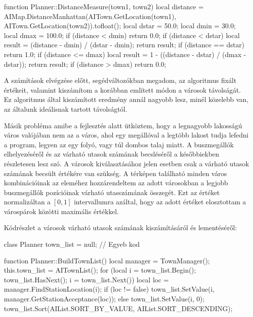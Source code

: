 \begin{cpp}
function Planner::DistanceMeasure(town1, town2)
{
  local distance = AIMap.DistanceManhattan(AITown.GetLocation(town1),
    AITown.GetLocation(town2)).tofloat();
  local dstar = 50.0;
  local dmin = 30.0;
  local dmax = 100.0;
  if (distance < dmin) {
    return 0.0;
  }
  if (distance < dstar) {
    local result = (distance - dmin) / (dstar - dmin);
    return result;
  }
  if (distance == dstar) {
    return 1.0;
  }
  if (distance <= dmax) {
    local result = 1 - ((distance - dstar) / (dmax - dstar));
    return result;
  }
  if (distance > dmax) {
    return 0.0;
  }
}
\end{cpp}

A számítások elvégzése előtt, segédváltozókban megadom, az algoritmus fixált értékeit, valamint kiszámítom a korábban említett módon a városok távolságát. Ez algoritmus által kiszámított eredmény annál nagyobb lesz, minél közelebb van, az általunk ideálisnak tartott távolságtól.

Másik probléma amibe a fejlesztés alatt ütköztem, hogy a legnagyobb lakosságú város valójában nem az a város, ahol egy megállóval a legtöbb lakost tudja lefedni a program, legyen az egy folyó, vagy túl dombos talaj miatt. A buszmegállók elhelyezéséről és az várható utasok számának becsléséről a későbbiekben részletesen lesz szó. A városok kiválasztásához jelen esetben csak a várható utasok számának becsült értékére van szükség. A térképen található minden város kombinációinak az eleméhez hozzárendeltem az adott városokban a legjobb buszmegállók pozícióinak várható utasszámának összegét. Ezt az értéket normalizáltan a $[0, 1]$ intervallumra azáltal, hogy az adott értéket elosztottam a várospárok közötti maximális értékkel.

Kódrészlet a városok várható utasok számának kiszámításáról és lementéséről:
\begin{cpp}

class Planner {
  town_list = null;
  // Egyeb kod
}

function Planner::BuildTownList()
{
  local manager = TownManager();
  this.town_list = AITownList();
  for (local i = town_list.Begin(); 
   town_list.HasNext(); i = town_list.Next()) {
    local loc = manager.FindStationLocation(i);
    if (loc != false) {
      town_list.SetValue(i, manager.GetStationAcceptance(loc));
    } else {
      town_list.SetValue(i, 0);
    }
  }
  town_list.Sort(AIList.SORT_BY_VALUE, AIList.SORT_DESCENDING);
}
\end{cpp}

